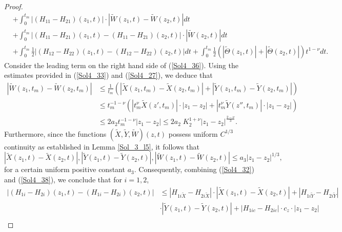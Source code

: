 \documentclass[10pt,a4paper]{amsart}
\begin{document}
\begin{proof}
\begin{equation}
\begin{split}
              &+\int_0^{t_m} |(H_{11}-H_{21})(z_1,t)|\cdot |\widetilde W(z_1,t)-\widetilde W(z_2,t)| dt \\
              &+ \int_0^{t_m}  |(H_{11}-H_{21})(z_1,t)-(H_{11}-H_{21})(z_2,t)|\cdot |\widetilde W(z_2,t)|dt\\
              &+\int_0^{t_m} \frac{1}{2}|(H_{12}-H_{22})(z_1,t)-(H_{12}-H_{22})(z_2,t)|dt+\int_0^{t_m}\frac{1}{2}\left(|\widetilde \Theta(z_1,t)|+|\widetilde \Theta(z_2,t)| \right)t^{1-\nu} dt.
          \end{split}
     \end{equation}
     Consider the leading term on the right hand side of (\ref{Sol4_36}). Using the estimates provided in (\ref{Sol4_33})  and (\ref{Sol4_27}), we deduce that
     \begin{equation}\label{Sol4_37}
         \begin{split}
             |\widetilde W(z_1,t_m)-\widetilde W(z_2,t_m)|&\leq \frac{1}{t_m}\left( \left|\widetilde X(z_1,t_m)-\widetilde X(z_2,t_m)\right|+\left|\widetilde Y(z_1,t_m)-\widetilde Y(z_2,t_m)\right|\right)\\
             &\leq  t_{m}^{-1-\nu}\left(\left|t_m^\nu\widetilde X(z',t_m)\right|\cdot|z_1-z_2|+ \left|t_m^\nu\widetilde Y(z'',t_m)\right|\cdot|z_1-z_2|\right)\\
             &\leq 2a_2t_{m}^{-1-\nu}|z_1-z_2|\leq 2a_2 \;K_2^{1+\nu}|z_1-z_2|^\frac{2-\nu}{3}.
         \end{split}
     \end{equation}
     Furthermore, since the functions $(\widetilde X,\widetilde Y,\widetilde W)(z,t)$ possess uniform $C^{1/3}$ continuity as established in Lemma \ref{Sol_3_l5}, it follows that
     \begin{equation}\label{Sol4_38}
       |\widetilde X(z_1,t)-\widetilde X(z_2,t)|, |\widetilde Y(z_1,t)-\widetilde Y(z_2,t)|, |\widetilde W(z_1,t)-\widetilde W(z_2,t)|\leq a_3|z_1-z_2|^{1/3},
     \end{equation}
     for a certain uniform positive constant $a_3$. Consequently, combining (\ref{Sol4_32}) and (\ref{Sol4_38}), we conclude that for $i=1,2$,
     \begin{equation*}\label{Sol4_39}
         \begin{split}
             \left| (H_{1i}-H_{2i})(z_1,t)-(H_{1i}-H_{2i})(z_2,t)\right| &\leq |H_{1i\widetilde X}-H_{2i\widetilde X}|\cdot|\widetilde X(z_1,t)-\widetilde X(z_2,t)|+ |H_{1i\widetilde Y}-H_{2i\widetilde Y}|\\& \cdot|\widetilde Y(z_1,t)-\widetilde Y(z_2,t)|+|H_{1ic}-H_{2ic}|\cdot c_z\cdot |z_1-z_2|\\

\end{split}
\end{equation*}
\end{proof}
\end{document}
